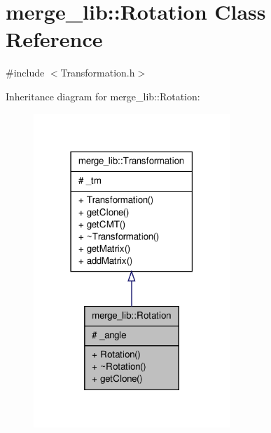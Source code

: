 \hypertarget{classmerge__lib_1_1_rotation}{\section{merge\-\_\-lib\-:\-:Rotation Class Reference}
\label{d3/d47/classmerge__lib_1_1_rotation}
}


{\ttfamily \#include $<$Transformation.\-h$>$}



Inheritance diagram for merge\-\_\-lib\-:\-:Rotation\-:
\nopagebreak
\begin{figure}[H]
\begin{center}
\leavevmode
\includegraphics[width=210pt]{db/d94/classmerge__lib_1_1_rotation__inherit__graph}
\end{center}
\end{figure}


